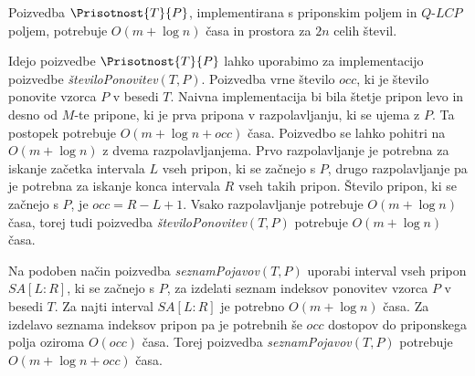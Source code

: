 \begin{izr}\label{izr:LCP}
    Poizvedba $\Prisotnost{T}{P}$, implementirana s priponskim poljem in $\textit{Q-LCP}$ poljem, potrebuje $O(m+\log{n})$ časa in prostora za $2n$ celih števil.
\end{izr}





Idejo poizvedbe $\Prisotnost{T}{P}$ lahko uporabimo za implementacijo poizvedbe \textit{številoPonovitev}$(T,P)$. Poizvedba vrne število $occ$, ki je število ponovite vzorca $P$ v besedi $T$. Naivna implementacija bi bila štetje pripon levo in desno od $M$-te pripone, ki je prva pripona v razpolavljanju, ki se ujema z $P$. Ta postopek potrebuje $O(m + \log{n}+occ)$ časa. Poizvedbo se lahko pohitri na $O(m + \log{n})$ z dvema razpolavljanjema. Prvo razpolavljanje je potrebna za iskanje začetka intervala $L$ vseh pripon, ki se začnejo s $P$, drugo razpolavljanje pa je potrebna za iskanje konca intervala $R$ vseh takih pripon. Število pripon, ki se začnejo s $P$, je $occ=R-L+1$. Vsako razpolavljanje potrebuje $O(m+\log{n})$ časa, torej tudi poizvedba \textit{številoPonovitev}$(T,P)$ potrebuje $O(m+\log{n})$ časa.

Na podoben način poizvedba \textit{seznamPojavov}$(T,P)$ uporabi interval vseh pripon $SA[L:R]$, ki se začnejo s $P$, za izdelati seznam indeksov ponovitev vzorca $P$ v besedi $T$. Za najti interval $SA[L:R]$ je potrebno $O(m+\log{n})$ časa. Za izdelavo seznama indeksov pripon pa je potrebnih še $occ$ dostopov do priponskega polja oziroma $O(occ)$ časa. Torej poizvedba \textit{seznamPojavov}$(T,P)$ potrebuje $O(m+\log{n}+occ)$ časa.


